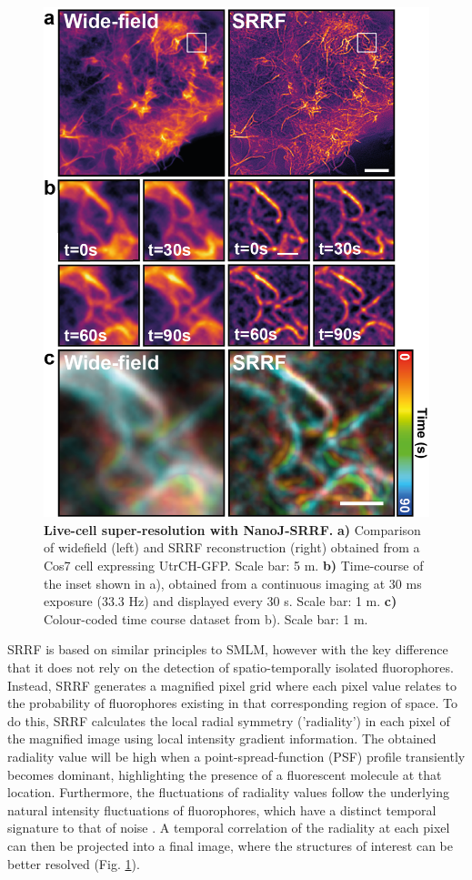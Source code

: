  \begin{figure}[!t]
    \centering
    \includegraphics{Figures/FigureSRRF_v4.png}
    \caption{\textbf{Live-cell super-resolution with NanoJ-SRRF.} \textbf{a)} Comparison of widefield (left) and SRRF reconstruction (right) obtained from a Cos7 cell expressing UtrCH-GFP. Scale bar: 5 \micro m. \textbf{b)} Time-course of the inset shown in a), obtained from  a continuous imaging at 30 ms exposure (33.3 Hz) and displayed every 30 s. Scale bar: 1 \micro m. \textbf{c)} Colour-coded time course dataset from b). Scale bar: 1 \micro m.}
    \label{fig:SRRF}
 \end{figure}
 
 SRRF is based on similar principles to SMLM, however with the key difference that it does not rely on the detection of spatio-temporally isolated fluorophores. Instead, SRRF generates a magnified pixel grid where each pixel value relates to the probability of fluorophores existing in that corresponding region of space. To do this, SRRF calculates the local radial symmetry ('radiality') in each pixel of the magnified image using local intensity gradient information. The obtained radiality value will be high when a point-spread-function (PSF) profile transiently becomes dominant, highlighting the presence of a fluorescent molecule at that location. Furthermore, the fluctuations of radiality values follow the underlying natural intensity fluctuations of fluorophores, which have a distinct temporal signature to that of noise \cite{dertinger2009fast}. A temporal correlation of the radiality at each pixel can then be projected into a final image, where the structures of interest can be better resolved (Fig. \ref{fig:SRRF}).

